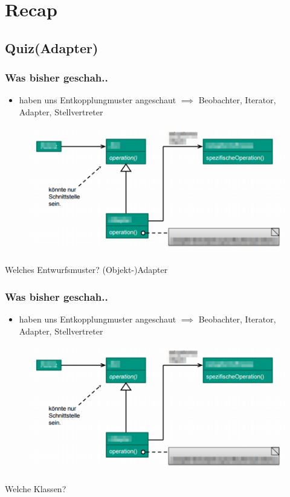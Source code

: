 \documentclass[18pt]{beamer}
\begin{document}
\section{Recap}
	\subsection{Quiz(Adapter)}
	\begin{frame}
		\frametitle{Was bisher geschah..}
		\begin{itemize}
			\item haben uns Entkopplungmuster angeschaut \pause
			\linebreak $\implies$ Beobachter, Iterator, Adapter, Stellvertreter \pause
		\end{itemize}
		\begin{figure}
			\includegraphics[scale=0.33]{./pics/tut4/adap-obj-mod.png}
		\end{figure}
		Welches Entwurfsmuster? \pause (Objekt-)Adapter
	\end{frame}
	
	\begin{frame}
		\frametitle{Was bisher geschah..}
		\begin{itemize}
			\item haben uns Entkopplungmuster angeschaut
			\linebreak $\implies$ Beobachter, Iterator, Adapter, Stellvertreter
		\end{itemize}
		\begin{figure}
			\includegraphics[scale=0.33]{./pics/tut4/adap-obj-mod.png}
		\end{figure}
		Welche Klassen?
	\end{frame}
	
\end{document}
